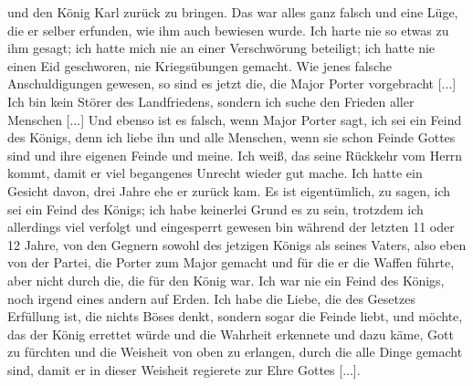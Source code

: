 und den König Karl zurück zu bringen. Das war alles ganz
falsch und eine Lüge, die er selber erfunden, wie ihm auch bewiesen 
wurde. Ich harte nie so etwas zu ihm gesagt; ich hatte
mich nie an einer Verschwörung beteiligt; ich hatte nie einen Eid
geschworen, nie Kriegsübungen gemacht. Wie jenes falsche 
Anschuldigungen gewesen, so sind es jetzt die, die Major Porter 
vorgebracht [...] Ich bin kein Störer des Landfriedens, sondern
ich suche den Frieden aller Menschen [...] Und ebenso ist es
falsch, wenn Major Porter sagt, ich sei ein Feind des Königs,
denn ich liebe ihn und alle Menschen, wenn sie schon Feinde
Gottes sind und ihre eigenen Feinde und meine. Ich weiß, das
seine Rückkehr vom Herrn kommt, damit er viel begangenes Unrecht 
wieder gut mache. Ich hatte ein Gesicht davon, drei Jahre
ehe er zurück kam. Es ist eigentümlich, zu sagen, ich sei ein
Feind des Königs; ich habe keinerlei Grund es zu sein, trotzdem
ich allerdings viel verfolgt und eingesperrt gewesen bin während
der letzten 11 oder 12 Jahre, von den Gegnern sowohl des
jetzigen Königs als seines Vaters, also eben von der Partei, die
Porter zum Major gemacht und für die er die Waffen führte,
aber nicht durch die, die für den König war. Ich war nie ein
Feind des Königs, noch irgend eines andern auf Erden. Ich
habe die Liebe, die des Gesetzes Erfüllung ist, die nichts Böses
denkt, sondern sogar die Feinde liebt, und möchte, das der König
errettet würde und die Wahrheit erkennete und dazu käme, Gott
zu fürchten und die Weisheit von oben zu erlangen, durch die
alle Dinge gemacht sind, damit er in dieser Weisheit regierete zur
Ehre Gottes [...].

